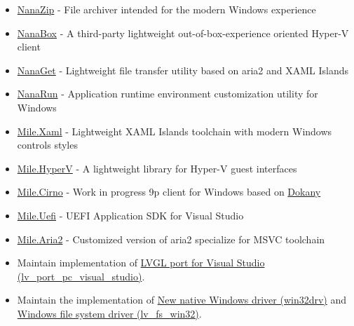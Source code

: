 \documentclass{resume}
\begin{document}
\begin{itemize}
  \item \href{https://github.com/M2Team/NanaZip}{NanaZip} - File archiver intended for the modern Windows experience
  \item \href{https://github.com/M2Team/NanaBox}{NanaBox} - A third-party lightweight out-of-box-experience oriented Hyper-V client
  \item \href{https://github.com/M2Team/NanaGet}{NanaGet} - Lightweight file transfer utility based on aria2 and XAML Islands
  \item \href{https://github.com/M2Team/NanaRun}{NanaRun} - Application runtime environment customization utility for Windows
\end{itemize} 

\begin{itemize}
  \item \href{https://github.com/ProjectMile/Mile.Xaml}{Mile.Xaml} - Lightweight XAML Islands toolchain with modern Windows controls styles
  \item \href{https://github.com/ProjectMile/Mile.HyperV}{Mile.HyperV} - A lightweight library for Hyper-V guest interfaces
  \item \href{https://github.com/ProjectMile/Mile.Cirno}{Mile.Cirno} - Work in progress 9p client for Windows based on \href{https://github.com/dokan-dev/dokany}{Dokany}
  \item \href{https://github.com/ProjectMile/Mile.Uefi}{Mile.Uefi} - UEFI Application SDK for Visual Studio
  \item \href{https://github.com/ProjectMile/Mile.Aria2}{Mile.Aria2} - Customized version of aria2 specialize for MSVC toolchain
\end{itemize} 

\begin{itemize}
  \item Maintain implementation of \href{https://github.com/lvgl/lv_port_pc_visual_studio}{LVGL port for Visual Studio (lv\_port\_pc\_visual\_studio)}.
  \item Maintain the implementation of \href{https://github.com/lvgl/lv_drivers/pull/117}{New native Windows driver (win32drv)} and \href{https://github.com/lvgl/lvgl/pull/2701}{Windows file system driver (lv\_fs\_win32)}.
\end{itemize}
\end{document}
